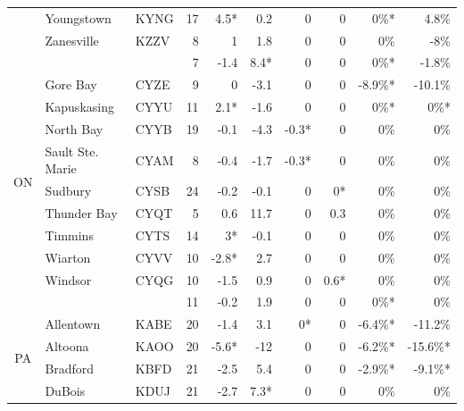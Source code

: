 \documentclass[twocol]{ametsoc}
\begin{document}
\begin{landscape}
\begin{table}[]
\begin{tabular}{cllrrrrrrr}
                     & Youngstown                 & KYNG & 17   & 4.5*  & 0.2   & 0     & 0    & 0\%*    & 4.8\%    \\
                     & Zanesville                 & KZZV & 8    & 1     & 1.8   & 0     & 0    & 0\%     & -8\%     \\ \cline{2-10} 
                     &                            &      & 7    & -1.4  & 8.4*  & 0     & 0    & 0\%*    & -1.8\%   \\ \hline
\multirow{9}{*}{ON}  & Gore Bay                   & CYZE & 9    & 0     & -3.1  & 0     & 0    & -8.9\%* & -10.1\%  \\
                     & Kapuskasing                & CYYU & 11   & 2.1*  & -1.6  & 0     & 0    & 0\%*    & 0\%*     \\
                     & North Bay                  & CYYB & 19   & -0.1  & -4.3  & -0.3* & 0    & 0\%     & 0\%      \\
                     & Sault Ste. Marie           & CYAM & 8    & -0.4  & -1.7  & -0.3* & 0    & 0\%     & 0\%      \\
                     & Sudbury                    & CYSB & 24   & -0.2  & -0.1  & 0     & 0*   & 0\%     & 0\%      \\
                     & Thunder Bay                & CYQT & 5    & 0.6   & 11.7  & 0     & 0.3  & 0\%     & 0\%      \\
                     & Timmins                    & CYTS & 14   & 3*    & -0.1  & 0     & 0    & 0\%     & 0\%      \\
                     & Wiarton                    & CYVV & 10   & -2.8* & 2.7   & 0     & 0    & 0\%     & 0\%      \\
                     & Windsor                    & CYQG & 10   & -1.5  & 0.9   & 0     & 0.6* & 0\%     & 0\%      \\ \cline{2-10} 
                     &                            &      & 11   & -0.2  & 1.9   & 0     & 0    & 0\%*    & 0\%      \\ \hline
\multirow{9}{*}{PA}  & Allentown                  & KABE & 20   & -1.4  & 3.1   & 0*    & 0    & -6.4\%* & -11.2\%  \\
                     & Altoona                    & KAOO & 20   & -5.6* & -12   & 0     & 0    & -6.2\%* & -15.6\%* \\
                     & Bradford                   & KBFD & 21   & -2.5  & 5.4   & 0     & 0    & -2.9\%* & -9.1\%*  \\
                     & DuBois                     & KDUJ & 21   & -2.7  & 7.3*  & 0     & 0    & 0\%     & 0\%      \\

\end{tabular}
\end{table}
\end{landscape}
\end{document}

